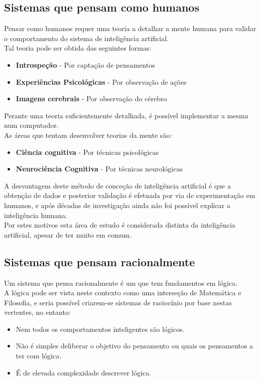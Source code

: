\documentclass[]{report}
\begin{document}
\subsection{Sistemas que pensam como humanos}
Pensar como humanos requer uma teoria a detalhar a mente humana para validar o comportamento do sistema de inteligência artificial.\\
Tal teoria pode ser obtida das seguintes formas:
\begin{itemize}
\item \textbf{Introspeção} - Por captação de pensamentos
\item \textbf{Experiências Psicológicas} - Por observação de ações
\item \textbf{Imagens cerebrais} - Por observação do cérebro
\end{itemize}
Perante uma teoria suficientemente detalhada, é possível implementar a mesma num computador.\\
As áreas que tentam desenvolver teorias da mente são:
\begin{itemize}
\item \textbf{Ciência cognitiva} - Por técnicas psicológicas
\item \textbf{Neurociência Cognitiva} - Por técnicas neurológicas
\end{itemize}
A desvantagem deste método de conceção de inteligência artificial é que a obtenção de dados e posterior validação é efetuada por via de experimentação em humanos, e após décadas de investigação ainda não foi possível explicar a inteligência humana.\\
Por estes motivos esta área de estudo é considerada distinta da inteligência artificial, apesar de ter muito em comum.
\subsection{Sistemas que pensam racionalmente}
Um sistema que pensa racionalmente é um que tem fundamentos em lógica.\\
A lógica pode ser vista neste contexto como uma interseção de Matemática e Filosofia, e seria possível criarem-se sistemas de raciocínio por base nestas vertentes, no entanto:
\begin{itemize}
\item Nem todos os comportamentos inteligentes são lógicos.
\item Não é simples deliberar o objetivo do pensamento ou quais os pensamentos a ter com lógica.
\item É de elevada complexidade descrever lógica.
\end{itemize}
\end{document}
